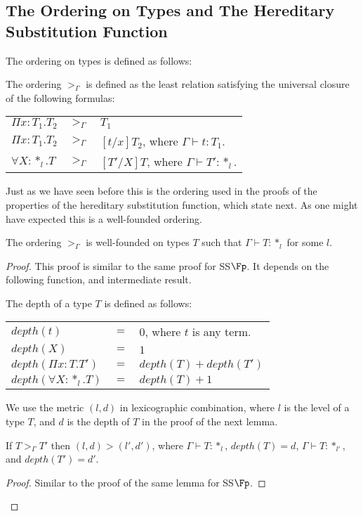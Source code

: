 \subsection{The Ordering on Types and The Hereditary Substitution Function}
\label{sec:the_hereditary_substitution_function_ssfe}
The ordering on types is defined as follows:
\begin{definition}
  The ordering $>_\Gamma$ is defined as the least relation satisfying the universal closure
  of the following formulas:
  \begin{center}
    \begin{tabular}{lll}
      $\Pi x:T_1.T_2$ & $>_\Gamma$ & $T_1$\\
      $\Pi x:T_1.T_2$ & $>_{\Gamma}$ & $[t/x]T_2$, where $\Gamma \vdash t:T_1$.\\
      $\forall X:*_l.T$  & $>_\Gamma$ & $[T'/X]T$, where $\Gamma \vdash T':*_l$.\\
    \end{tabular}
  \end{center}
  \label{def:ordering_ssfe}
\end{definition}
Just as we have seen before this is the ordering used in the proofs of
the properties of the hereditary substitution function, which state
next.  As one might have expected this is a well-founded ordering.
\begin{thm}
  The ordering $>_\Gamma$ is well-founded on types $T$ such that 
  $\Gamma \vdash T:*_l$ for some $l$.
  \label{thm:well-founded_ordering_ssfe}
\end{thm}
\begin{proof}
  This proof is similar to the same proof for SS$\Fp$.  It depends on
  the following function, and intermediate result.
  \begin{definition}
  The depth of a type $T$ is defined as follows:
  \begin{center}
    \begin{tabular}{lll}
      $depth(t)$                  & $=$ & $0$, where $t$ is any term.\\
      $depth(X)$                  & $=$ & $1$\\
      $depth(\Pi x:T.T')$   & $=$ & $depth(T) + depth(T')$\\
      $depth(\forall X:*_l.T)$ & $=$ & $depth(T) + 1$\\
    \end{tabular}
  \end{center}
\end{definition}
\noindent
We use the metric $(l,d)$ in lexicographic combination, where $l$ is the level of
a type $T$, and $d$ is the depth of $T$ in the proof of the next lemma.  

\begin{lemma}
  \label{lemma:well-founded_measure_ssfe}
  If $T >_\Gamma T'$ then $(l,d) > (l',d')$, where $\Gamma \vdash T:*_l$, 
  $depth(T) = d$,  $\Gamma \vdash T:*_{l'}$, and $depth(T') = d'$.
\end{lemma}
\begin{proof}
  Similar to the proof of the same lemma for SS$\Fp$. 
\end{proof}
\end{proof}
